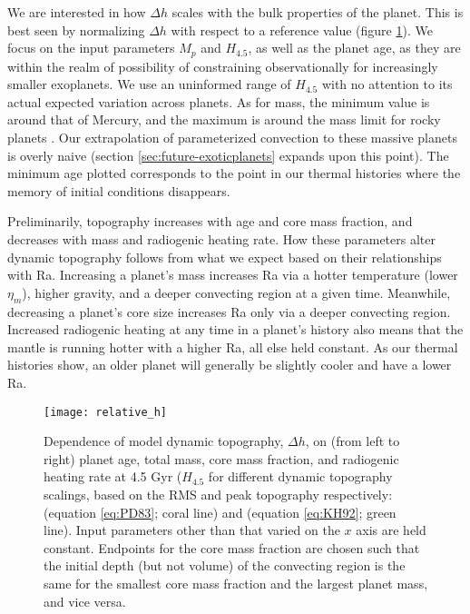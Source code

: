 We are interested in how $\Delta h$ scales with the bulk properties of the planet. This is best seen by normalizing $\Delta h$ with respect to a reference value (figure \ref{fig:RMS_v_planet}). We focus on the input parameters $M_p$ and $H_{4.5}$, as well as the planet age, as they are within the realm of possibility of constraining observationally for increasingly smaller exoplanets. We use an uninformed range of $H_{4.5}$ with no attention to its actual expected variation across planets. As for mass, the minimum value is around that of Mercury, and the maximum is around the mass limit for rocky planets \citep{Rogers2015}. Our extrapolation of parameterized convection to these massive planets is overly naive (section \ref{sec:future-exoticplanets} expands upon this point). The minimum age plotted corresponds to the point in our thermal histories where the memory of initial conditions disappears.

Preliminarily, topography increases with age and core mass fraction, and decreases with mass and radiogenic heating rate. How these parameters alter dynamic topography follows from what we expect based on their relationships with Ra. Increasing a planet's mass increases Ra via a hotter temperature (lower $\eta_m$), higher gravity, and a deeper convecting region at a given time. Meanwhile, decreasing a planet's core size increases Ra only via a deeper convecting region. Increased radiogenic heating at any time in a planet's history also means that the mantle is running hotter with a higher Ra, all else held constant. As our thermal histories show, an older planet will generally be slightly cooler and have a lower Ra.
 




\begin{figure}
  \centering
  \texttt{[image: relative\_h]}
\caption{Dependence of model dynamic topography, $\Delta h$, on (from left to right) planet age, total mass, core mass fraction, and radiogenic heating rate at 4.5 Gyr ($H_{4.5}$ for different dynamic topography scalings, based on the RMS and peak topography respectively: \citet{Parsons1983} (equation \ref{eq:PD83}; coral line) and \citet{Kiefer1992} (equation \ref{eq:KH92}; green line). Input parameters other than that varied on the $x$ axis are held constant. Endpoints for the core mass fraction are chosen such that the initial depth (but not volume) of the convecting region is the same for the smallest core mass fraction and the largest planet mass, and vice versa.}
\label{fig:RMS_v_planet}
\end{figure}


